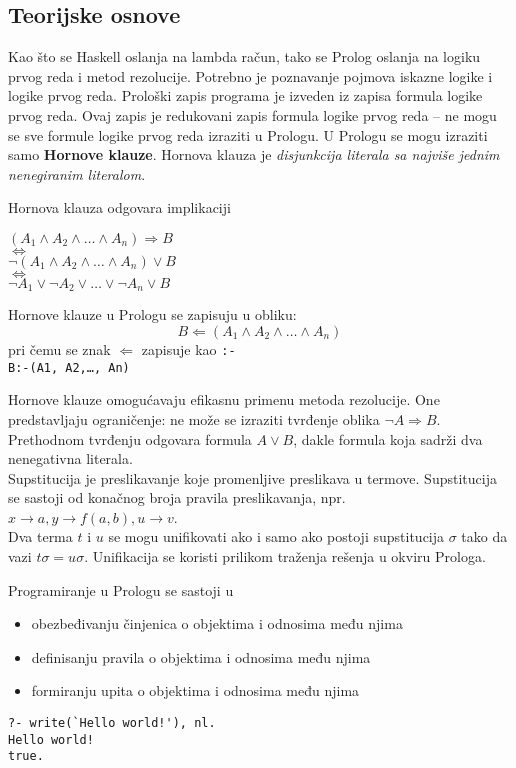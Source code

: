 \documentclass[../main.tex]{subfiles}
\begin{document}
\subsection{Teorijske osnove}
Kao što se Haskell oslanja na lambda račun, tako se Prolog oslanja na logiku prvog reda i metod rezolucije. Potrebno je poznavanje pojmova iskazne logike i logike prvog reda. Prološki zapis programa je izveden iz zapisa formula logike prvog reda. Ovaj zapis je redukovani zapis formula logike prvog reda -- ne mogu se sve formule logike prvog reda izraziti u Prologu. U Prologu se mogu izraziti samo {\bf Hornove klauze}. Hornova klauza je {\it disjunkcija literala sa najviše jednim nenegiranim literalom}.
\begin{multicols}{2}
Hornova klauza odgovara implikaciji
\begin{center}
$(A_1 \wedge A_2 \wedge \ldots \wedge A_n) \Rightarrow B$\\
$\Longleftrightarrow$\\
$\neg(A_1 \wedge A_2 \wedge \ldots \wedge A_n) \vee B$\\
$\Longleftrightarrow$\\
$\neg A_1 \vee\neg A_2 \vee \ldots \vee\neg A_n \vee B$\\
\end{center}

\columnbreak
\noindent Hornove klauze u Prologu se zapisuju u obliku:
$$ B\Leftarrow (A_1 \wedge A_2 \wedge \ldots \wedge A_n)  $$
pri čemu se znak $\Leftarrow$ zapisuje kao \texttt{:-}
\\ \texttt{B:-(A1, A2,\ldots, An)}
\end{multicols}

Hornove klauze omogućavaju efikasnu primenu metoda rezolucije. One predstavljaju ograničenje: ne može se izraziti tvrđenje oblika $\neg A\Rightarrow B$. Prethodnom tvrđenju odgovara formula $A\vee B$, dakle formula koja sadrži dva nenegativna literala.
\\
Supstitucija je preslikavanje koje promenljive preslikava u termove. Supstitucija se sastoji od konačnog broja pravila preslikavanja, npr. $x\rightarrow a, y\rightarrow f(a,b), u\rightarrow v$.
\\
Dva terma $t$ i $u$ se mogu unifikovati ako i samo ako postoji supstitucija $\sigma$ tako da vazi $t\sigma = u\sigma$. Unifikacija se koristi prilikom traženja rešenja u okviru Prologa.

\begin{multicols}{2}
Programiranje u Prologu se sastoji u
\begin{itemize}
\item obezbeđivanju činjenica o objektima i odnosima među njima 
\item definisanju pravila o objektima i odnosima među njima
\item formiranju upita o objektima i odnosima među njima
\end{itemize}
\columnbreak
\begin{boxprimer}
\begin{Verbatim}
?- write(`Hello world!'), nl.
Hello world!
true.
\end{Verbatim}
\end{boxprimer}
\end{multicols}
\end{document}
